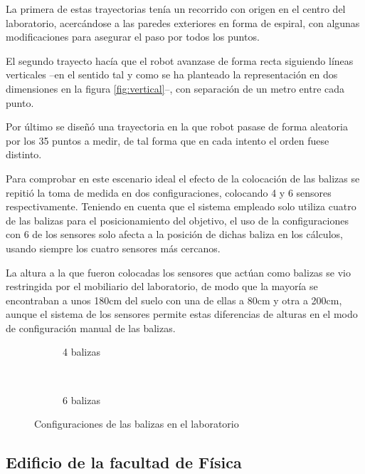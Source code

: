 La primera de estas trayectorias tenía un recorrido con origen en el centro del laboratorio, acercándose a las paredes exteriores en forma de espiral, con algunas modificaciones para asegurar el paso por todos los puntos.

El segundo trayecto hacía que el robot avanzase de forma recta siguiendo líneas verticales --en el sentido tal y como se ha planteado la representación en dos dimensiones en la figura \ref{fig:vertical}--, con separación de un metro entre cada punto.

Por último se diseñó una trayectoria en la que robot pasase de forma aleatoria por los 35 puntos a medir, de tal forma que en cada intento el orden fuese distinto.

Para comprobar en este escenario ideal el efecto de la colocación de las balizas se repitió la toma de medida en dos configuraciones, colocando 4 y 6 sensores respectivamente.
Teniendo en cuenta que el sistema empleado solo utiliza cuatro de las balizas para el posicionamiento del objetivo, el uso de la configuraciones con 6 de los sensores solo afecta a la posición de dichas baliza en los cálculos, usando siempre los cuatro sensores más cercanos.

La altura a la que fueron colocadas los sensores que actúan como balizas se vio restringida por el mobiliario del laboratorio, de modo que la mayoría se encontraban a unos 180cm del suelo con una de ellas a 80cm y otra a 200cm, aunque el sistema de los sensores permite estas diferencias de alturas en el modo de configuración manual de las balizas.

\begin{figure}[H]
  \begin{subfigure}[b]{.5\textwidth}
    \centering
    \def\svgwidth{0.7\linewidth}
     
    \caption{4 balizas}
    \label{fig:lab_4sens}
  \end{subfigure}
  \ \
  \begin{subfigure}[b]{.5\textwidth}
    \centering
    \def\svgwidth{0.82\linewidth}
      
    \caption{6 balizas}
    \label{fig:lab_6sens}
  \end{subfigure}
  \caption{Configuraciones de las balizas en el laboratorio}
  \label{fig:lab_sensores}
\end{figure}

\subsection{Edificio de la facultad de Física}

